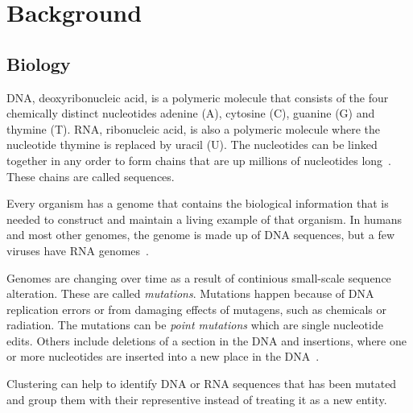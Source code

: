 \section{Background}

\subsection{Biology} DNA, deoxyribonucleic acid, is a polymeric molecule that
consists of the four chemically distinct nucleotides adenine (A), cytosine
(C), guanine (G) and thymine (T). RNA, ribonucleic acid, is also a polymeric
molecule where the nucleotide thymine is replaced by uracil (U).  The
nucleotides can be linked together in any order to form chains that are up
millions of nucleotides long~\cite[pp.~8-9]{brown}. These chains are called
sequences.

Every organism has a genome that contains the biological information that is
needed to construct and maintain a living example of that organism. In humans
and most other genomes, the genome is made up of DNA sequences, but a few
viruses have RNA genomes~\cite[pp. 3-4]{brown}.

Genomes are changing over time as a result of continious small-scale sequence
alteration. These are called \textit{mutations}. Mutations happen because of
DNA replication errors or from damaging effects of mutagens, such as chemicals
or radiation. The mutations can be \textit{point mutations} which are single
nucleotide edits. Others include deletions of a section in the DNA and
insertions, where one or more nucleotides are inserted into a new place in the
DNA~\cite[pp. 505-506]{brown}.

Clustering can help to identify DNA or RNA sequences that has been mutated and
group them with their representive instead of treating it as a new entity.